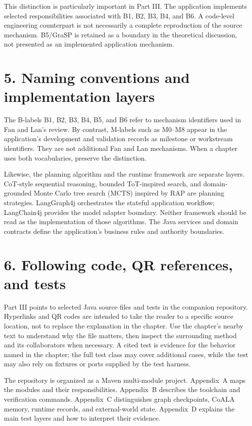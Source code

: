 This distinction is particularly important in Part III. The application implements selected responsibilities associated with B1, B2, B3, B4, and B6. A code-level engineering counterpart is not necessarily a complete reproduction of the source mechanism. B5/GraSP is retained as a boundary in the theoretical discussion, not presented as an implemented application mechanism.

\section*{5. Naming conventions and implementation layers}

The B-labels B1, B2, B3, B4, B5, and B6 refer to mechanism identifiers used in Fan and Lan's review. By contrast, M-labels such as M0--M8 appear in the application's development and validation records as milestone or workstream identifiers. They are not additional Fan and Lan mechanisms. When a chapter uses both vocabularies, preserve the distinction.

Likewise, the planning algorithm and the runtime framework are separate layers. CoT-style sequential reasoning, bounded ToT-inspired search, and domain-grounded Monte Carlo tree search (MCTS) inspired by RAP are planning strategies. LangGraph4j orchestrates the stateful application workflow; LangChain4j provides the model adapter boundary. Neither framework should be read as the implementation of those algorithms. The Java services and domain contracts define the application's business rules and authority boundaries.

\section*{6. Following code, QR references, and tests}

Part III points to selected Java source files and tests in the companion repository. Hyperlinks and QR codes are intended to take the reader to a specific source location, not to replace the explanation in the chapter. Use the chapter's nearby text to understand why the file matters, then inspect the surrounding method and its collaborators when necessary. A cited test is evidence for the behavior named in the chapter; the full test class may cover additional cases, while the test may also rely on fixtures or ports supplied by the test harness.

The repository is organized as a Maven multi-module project. Appendix~A maps the modules and their responsibilities. Appendix~B describes the toolchain and verification commands. Appendix~C distinguishes graph checkpoints, CoALA memory, runtime records, and external-world state. Appendix~D explains the main test layers and how to interpret their evidence.

